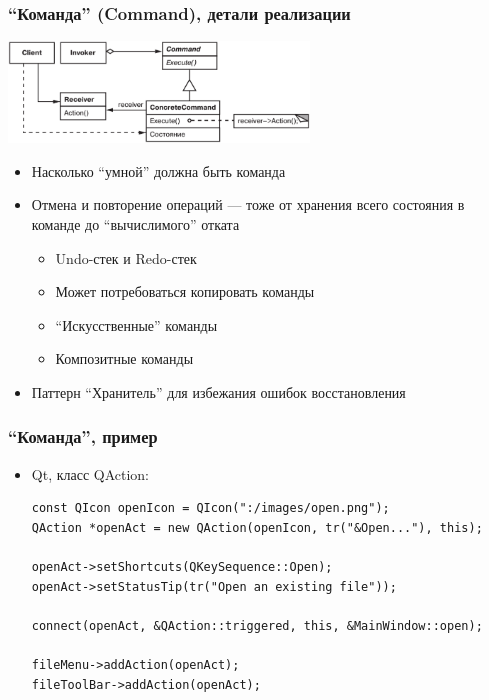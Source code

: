 \documentclass[xetex,mathserif,serif]{beamer}
\begin{document}
	\begin{frame}
		\frametitle{``Команда'' (Command), детали реализации}
		\begin{center}
			\includegraphics[width=0.6\textwidth]{command.png}
		\end{center}
		\begin{itemize}
			\item Насколько ``умной'' должна быть команда
			\item Отмена и повторение операций --- тоже от хранения всего состояния в команде до ``вычислимого'' отката
			\begin{itemize}
				\item Undo-стек и Redo-стек
				\item Может потребоваться копировать команды
				\item ``Искусственные'' команды
				\item Композитные команды
			\end{itemize}
			\item Паттерн ``Хранитель'' для избежания ошибок восстановления
		\end{itemize}
	\end{frame}

	\begin{frame}[fragile]
		\frametitle{``Команда'', пример}
		\begin{itemize}
			\item Qt, класс QAction:
			\begin{verbatim}
const QIcon openIcon = QIcon(":/images/open.png");
QAction *openAct = new QAction(openIcon, tr("&Open..."), this);

openAct->setShortcuts(QKeySequence::Open);
openAct->setStatusTip(tr("Open an existing file"));

connect(openAct, &QAction::triggered, this, &MainWindow::open);

fileMenu->addAction(openAct);
fileToolBar->addAction(openAct);
			\end{verbatim}
		\end{itemize}
	\end{frame}
\end{document}

